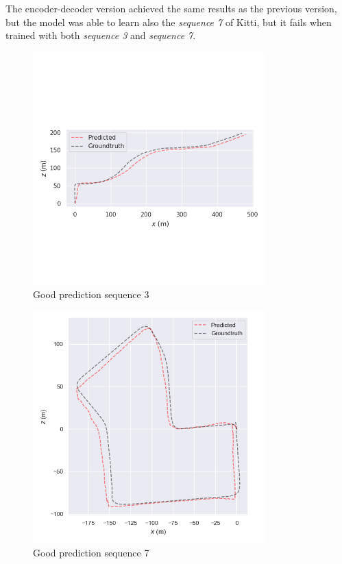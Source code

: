 The encoder-decoder version achieved the same results as the previous version, but the model was able to learn also the \textit{sequence 7} of Kitti, but it fails when trained with both \textit{sequence 3} and \textit{sequence 7}.
\begin{figure}[H]
    \centering
    \includegraphics[width=0.8\textwidth]{images/6_1_well_predicted_seq_3}
    \caption{Good prediction sequence 3}\label{fig:well-predicted-seq-3}
\end{figure}
\begin{figure}[H]
    \centering
    \includegraphics[width=0.8\textwidth]{images/6_1_well_predicted_seq_7}
    \caption{Good prediction sequence 7}\label{fig:well-predicted-seq-7}
\end{figure}

